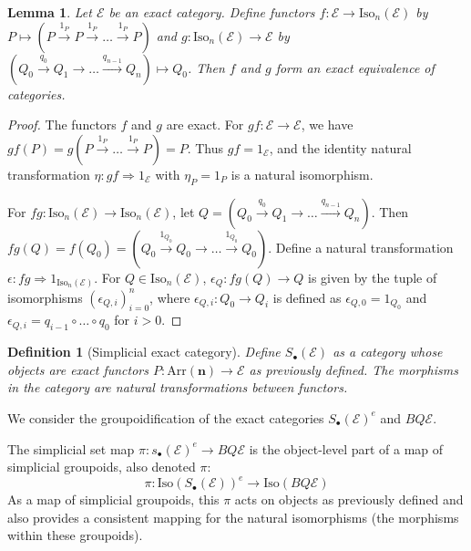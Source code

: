 \documentclass[12pt]{report}
\numberwithin{equation}{section}
\newtheorem{definition}[dummy]{Definition}
\newtheorem{lemma}[dummy]{Lemma}
\begin{document}
	\begin{lemma}\label{lem:isoequivexact}
		Let $\mathcal{E}$ be an exact category. Define functors $f: \mathcal{E} \to \mathrm{Iso}_n(\mathcal{E})$ by $P \mapsto (P \xrightarrow{1_P} P \xrightarrow{1_P} \dots \xrightarrow{1_P} P)$ and $g: \mathrm{Iso}_n(\mathcal{E}) \to \mathcal{E}$ by $(Q_0 \xrightarrow{q_0} Q_1 \to \dots \xrightarrow{q_{n-1}} Q_n) \mapsto Q_0$. Then $f$ and $g$ form an exact equivalence of categories.
	\end{lemma}
	\begin{proof}
		The functors $f$ and $g$ are exact.
		For $gf: \mathcal{E} \to \mathcal{E}$, we have $gf(P) = g(P \xrightarrow{1_P} \dots \xrightarrow{1_P} P) = P$. Thus $gf = 1_{\mathcal{E}}$, and the identity natural transformation $\eta: gf \Rightarrow 1_{\mathcal{E}}$ with $\eta_P = 1_P$ is a natural isomorphism.
		
		For $fg: \mathrm{Iso}_n(\mathcal{E}) \to \mathrm{Iso}_n(\mathcal{E})$, let $Q = (Q_0 \xrightarrow{q_0} Q_1 \to \dots \xrightarrow{q_{n-1}} Q_n)$. Then $fg(Q) = f(Q_0) = (Q_0 \xrightarrow{1_{Q_0}} Q_0 \to \dots \xrightarrow{1_{Q_0}} Q_0)$.
		Define a natural transformation $\epsilon: fg \Rightarrow 1_{\mathrm{Iso}_n(\mathcal{E})}$. For $Q \in \mathrm{Iso}_n(\mathcal{E})$, $\epsilon_Q: fg(Q) \to Q$ is given by the tuple of isomorphisms $(\epsilon_{Q,i})_{i=0}^n$, where $\epsilon_{Q,i}: Q_0 \to Q_i$ is defined as $\epsilon_{Q,0} = 1_{Q_0}$ and $\epsilon_{Q,i} = q_{i-1} \circ \dots \circ q_0$ for $i > 0$.
	\end{proof}
	
	
	
	\begin{definition}[Simplicial exact category]
		Define \( S_\bullet(\mathcal{E}) \) as a category whose objects are exact functors \( P:\mathrm{Arr} (\mathbf{n}) \to \mathcal{E}\) as previously defined. The morphisms in the category are natural transformations between functors.
	\end{definition}
	
	
	We consider the groupoidification of the exact categories $S_\bullet(\mathcal{E})^e$ and $BQ\mathcal{E}$.
	
	The simplicial set map $\pi \colon s_\bullet(\mathcal{E})^e \to BQ\mathcal{E}$ is the object-level part of a map of simplicial groupoids, also denoted $\pi$:
	\[ \pi \colon \mathrm{Iso}(S_\bullet(\mathcal{E}))^e \to \mathrm{Iso}(BQ\mathcal{E}) \]
	As a map of simplicial groupoids, this $\pi$ acts on objects as previously defined and also provides a consistent mapping for the natural isomorphisms (the morphisms within these groupoids).
	
\end{document}
